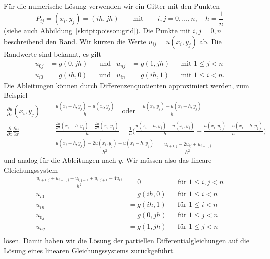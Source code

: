 Für die numerische Lösung verwenden wir ein Gitter mit den Punkten
\[
P_{ij}
=
(x_i,y_j)
=
(ih, jh)
\qquad\text{mit}\qquad
i,j=0,\dots,n,\quad
h = \frac1n
\]
(siehe auch Abbildung~\ref{skript:poisson:grid}).
Die Punkte mit $i,j=0,n$ beschreibend den Rand.
Wir kürzen die Werte $u_{ij}=u(x_i,y_j)$ ab.
Die Randwerte sind bekannt, es gilt
\begin{align*}
u_{0j} &= g(0,jh)
&&\text{und}&
u_{nj} &= g(1,jh)
&&\text{mit $1\le j < n$}
\\
u_{i0} &= g(ih,0)
&&\text{und}&
u_{in} &= g(ih,1)
&&\text{mit $1\le i < n$.}
\end{align*}
Die Ableitungen können durch Differenzenquotienten approximiert werden,
zum Beispiel
\begin{align*}
\frac{\partial u}{\partial x}(x_i,y_j)
&=
\frac{u(x_i+h,y_j)-u(x_i,y_j)}{h}
\quad\text{oder}\quad
\frac{u(x_i,y_j)-u(x_i-h,y_j)}{h}
\\
\frac{\partial}{\partial x}
\frac{\partial u}{\partial x}
&=
\frac{\displaystyle
\frac{\partial u}{\partial x}(x_i+h,y_j)
-
\frac{\partial u}{\partial x}(x_i,y_j)
}{h}
=
\frac1h 
\biggl(
\frac{u(x_i+h,y_j) - u(x_i,y_j)}{h}
-
\frac{u(x_i,y_j) - u(x_i-h,y_j)}{h}
\biggr)
\\
&=
\frac{ u(x_i+h,y_j)-2u(x_i,y_j)+u(x_i-h,y_j) }{h^2}
=
\frac{u_{i+1,j}-2u_{ij}+u_{i-1,j}}{h^2}
\end{align*}
und analog für die Ableitungen nach $y$.
Wir müssen also das lineare Gleichungssystem
\begin{equation}
\begin{aligned}
\frac{u_{i+1,j}+u_{i-1,j}+u_{i,j-1}+u_{i,j+1}-4u_{ij}}{h^2} &=0
&&\text{für $1 \le i,j< n$}
\\
u_{i0} &= g(ih, 0)&&\text{für $1\le i<n$}\\
u_{in} &= g(ih, 1)&&\text{für $1\le i<n$}\\
u_{0j} &= g(0, jh)&&\text{für $1\le j<n$}\\
u_{nj} &= g(1, jh)&&\text{für $1\le j<n$}\\
\end{aligned}
\end{equation}
lösen.
Damit haben wir die Lösung der partiellen Differentialgleichungen auf
die Lösung eines linearen Gleichungssystems zurückgeführt.

